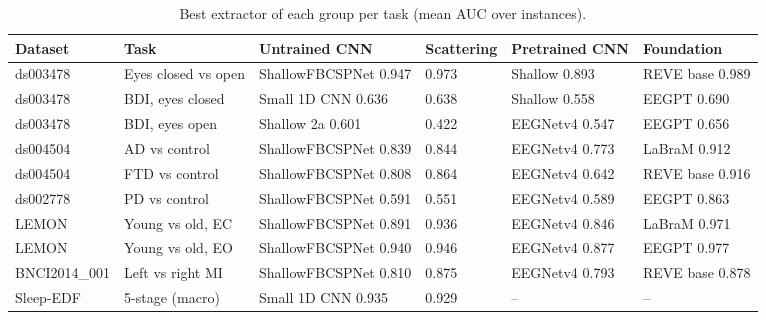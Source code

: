 \documentclass[11pt]{article}
\begin{document}
\begin{table}[t]
\centering\footnotesize\setlength{\tabcolsep}{4pt}
\caption{Best extractor of each group per task (mean AUC over instances).}
\label{tab:best}
\begin{tabular}{@{}llllll@{}}
\toprule
Dataset & Task & Untrained CNN & Scattering & Pretrained CNN & Foundation \\
\midrule
ds003478 & Eyes closed vs open & ShallowFBCSPNet 0.947 & 0.973 & Shallow 0.893 & REVE base 0.989 \\
ds003478 & BDI, eyes closed & Small 1D CNN 0.636 & 0.638 & Shallow 0.558 & EEGPT 0.690 \\
ds003478 & BDI, eyes open & Shallow 2a 0.601 & 0.422 & EEGNetv4 0.547 & EEGPT 0.656 \\
ds004504 & AD vs control & ShallowFBCSPNet 0.839 & 0.844 & EEGNetv4 0.773 & LaBraM 0.912 \\
ds004504 & FTD vs control & ShallowFBCSPNet 0.808 & 0.864 & EEGNetv4 0.642 & REVE base 0.916 \\
ds002778 & PD vs control & ShallowFBCSPNet 0.591 & 0.551 & EEGNetv4 0.589 & EEGPT 0.863 \\
LEMON & Young vs old, EC & ShallowFBCSPNet 0.891 & 0.936 & EEGNetv4 0.846 & LaBraM 0.971 \\
LEMON & Young vs old, EO & ShallowFBCSPNet 0.940 & 0.946 & EEGNetv4 0.877 & EEGPT 0.977 \\
BNCI2014\_001 & Left vs right MI & ShallowFBCSPNet 0.810 & 0.875 & EEGNetv4 0.793 & REVE base 0.878 \\
Sleep-EDF & 5-stage (macro) & Small 1D CNN 0.935 & 0.929 & -- & -- \\
\bottomrule
\end{tabular}
\end{table}
\end{document}
